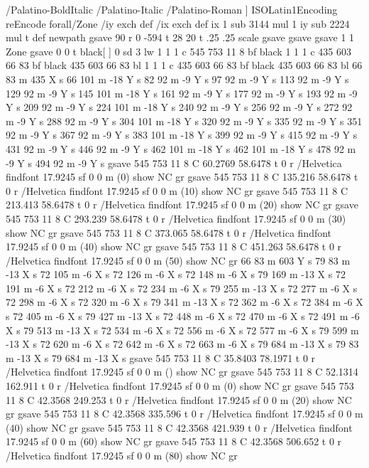  /Palatino-BoldItalic /Palatino-Italic /Palatino-Roman ] {ISOLatin1Encoding reEncode } forall/Zone {/iy exch def /ix exch def  ix 1 sub  3144 mul  1 iy sub  2224 mul t} def
newpath  gsave  90 r 0 -594 t  28 20 t .25 .25 scale  gsave 
 gsave  gsave 
 1 1 Zone
 gsave  0 0 t black[  ] 0 sd 3 lw 1 1 1 c 545 753 11 8 bf black 1 1 1 c 435 603 66 83 bf black 435 603 66 83 bl 1 1 1 c 435 603 66 83 bf black 435 603 66 83 bl 66 83 m 435 X s 66 101 m -18 Y s 82 92 m -9 Y s 97 92 m -9 Y s 113 92 m -9 Y s 129 92 m -9
 Y s 145 101 m -18 Y s 161 92 m -9 Y s 177 92 m -9 Y s 193 92 m -9 Y s 209 92 m -9 Y s 224 101 m -18 Y s 240 92 m -9 Y s 256 92 m -9 Y s 272 92 m -9 Y s 288 92 m -9 Y s 304 101 m -18 Y s 320 92 m -9 Y s 335 92 m -9 Y s 351 92 m -9 Y s 367 92 m -9 Y s
 383 101 m -18 Y s 399 92 m -9 Y s 415 92 m -9 Y s 431 92 m -9 Y s 446 92 m -9 Y s 462 101 m -18 Y s 462 101 m -18 Y s 478 92 m -9 Y s 494 92 m -9 Y s
 gsave  545 753 11 8 C 60.2769 58.6478 t 0 r /Helvetica findfont 17.9245 sf 0 0 m (0) show NC gr 
 gsave  545 753 11 8 C 135.216 58.6478 t 0 r /Helvetica findfont 17.9245 sf 0 0 m (10) show NC gr 
 gsave  545 753 11 8 C 213.413 58.6478 t 0 r /Helvetica findfont 17.9245 sf 0 0 m (20) show NC gr 
 gsave  545 753 11 8 C 293.239 58.6478 t 0 r /Helvetica findfont 17.9245 sf 0 0 m (30) show NC gr 
 gsave  545 753 11 8 C 373.065 58.6478 t 0 r /Helvetica findfont 17.9245 sf 0 0 m (40) show NC gr 
 gsave  545 753 11 8 C 451.263 58.6478 t 0 r /Helvetica findfont 17.9245 sf 0 0 m (50) show NC gr  66 83 m 603 Y s 79 83 m -13 X s 72 105 m -6 X s 72 126 m -6 X s 72 148 m -6 X s 79 169 m -13 X s 72 191 m -6 X s 72 212 m -6 X s 72 234 m -6 X s 79 255
 m -13 X s 72 277 m -6 X s 72 298 m -6 X s 72 320 m -6 X s 79 341 m -13 X s 72 362 m -6 X s 72 384 m -6 X s 72 405 m -6 X s 79 427 m -13 X s 72 448 m -6 X s 72 470 m -6 X s 72 491 m -6 X s 79 513 m -13 X s 72 534 m -6 X s 72 556 m -6 X s 72 577 m -6
 X s 79 599 m -13 X s 72 620 m -6 X s 72 642 m -6 X s 72 663 m -6 X s 79 684 m -13 X s 79 83 m -13 X s 79 684 m -13 X s
 gsave  545 753 11 8 C 35.8403 78.1971 t 0 r /Helvetica findfont 17.9245 sf 0 0 m () show NC gr 
 gsave  545 753 11 8 C 52.1314 162.911 t 0 r /Helvetica findfont 17.9245 sf 0 0 m (0) show NC gr 
 gsave  545 753 11 8 C 42.3568 249.253 t 0 r /Helvetica findfont 17.9245 sf 0 0 m (20) show NC gr 
 gsave  545 753 11 8 C 42.3568 335.596 t 0 r /Helvetica findfont 17.9245 sf 0 0 m (40) show NC gr 
 gsave  545 753 11 8 C 42.3568 421.939 t 0 r /Helvetica findfont 17.9245 sf 0 0 m (60) show NC gr 
 gsave  545 753 11 8 C 42.3568 506.652 t 0 r /Helvetica findfont 17.9245 sf 0 0 m (80) show NC gr 
